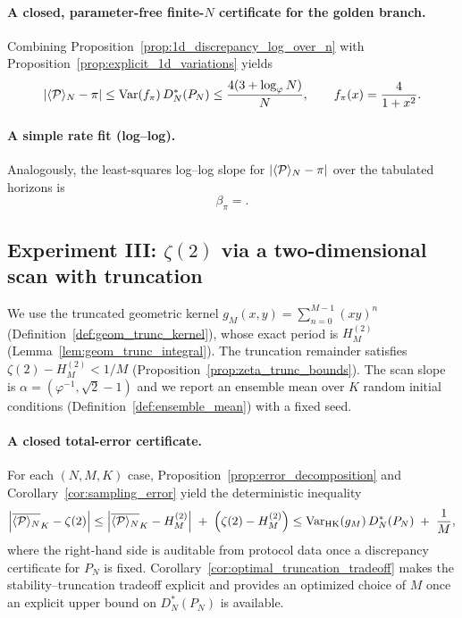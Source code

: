 \paragraph{A closed, parameter-free finite-$N$ certificate for the golden branch.}
Combining Proposition~\ref{prop:1d_discrepancy_log_over_n} with Proposition~\ref{prop:explicit_1d_variations} yields
\[
|\langle \mathcal{P} \rangle_N-\pi|
\le \mathrm{Var}(f_{\pi})\,D_N^\ast(P_N)
\le \frac{4(3+\log_\varphi N)}{N},
\qquad f_{\pi}(x)=\frac{4}{1+x^2}.
\]

\paragraph{A simple rate fit (log--log).}
Analogously, the least-squares log--log slope for $|\langle \mathcal{P} \rangle_N-\pi|$ over the tabulated horizons is
\[
\beta_{\pi}=.
\]

\subsection{Experiment III: \texorpdfstring{$\zeta(2)$}{zeta(2)} via a two-dimensional scan with truncation}
\label{sec:exp_zeta2}

We use the truncated geometric kernel $g_M(x,y)=\sum_{n=0}^{M-1}(xy)^n$ (Definition~\ref{def:geom_trunc_kernel}), whose exact period is $H_M^{(2)}$ (Lemma~\ref{lem:geom_trunc_integral}). The truncation remainder satisfies $\zeta(2)-H_M^{(2)}<1/M$ (Proposition~\ref{prop:zeta_trunc_bounds}). The scan slope is $\alpha=(\varphi^{-1},\sqrt{2}-1)$ and we report an ensemble mean over $K$ random initial conditions (Definition~\ref{def:ensemble_mean}) with a fixed seed.

\paragraph{A closed total-error certificate.}
For each $(N,M,K)$ case, Proposition~\ref{prop:error_decomposition} and Corollary~\ref{cor:sampling_error} yield the deterministic inequality
\[
\left|\overline{\langle \mathcal{P} \rangle_N}_K-\zeta(2)\right|
\le
\left|\overline{\langle \mathcal{P} \rangle_N}_K-H_M^{(2)}\right|
\;+\;\left(\zeta(2)-H_M^{(2)}\right)
\le
\mathrm{Var}_{\mathrm{HK}}(g_M)\,D_N^\ast(P_N)
\;+\;\frac{1}{M},
\]
where the right-hand side is auditable from protocol data once a discrepancy certificate for $P_N$ is fixed.
Corollary~\ref{cor:optimal_truncation_tradeoff} makes the stability--truncation tradeoff explicit and provides an optimized choice of $M$ once an explicit upper bound on $D_N^\ast(P_N)$ is available.

